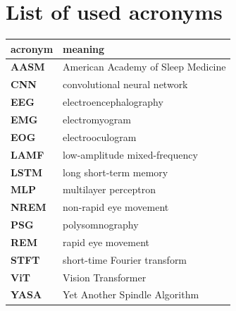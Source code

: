 \chapter*{List of used acronyms}
\begin{tabular}{l|l}
  {\bf acronym} & {\bf meaning}  \\ \hline
  {\bf AASM} & American Academy of Sleep Medicine \\
  {\bf CNN} & convolutional neural network \\
  {\bf EEG} & electroencephalography \\
  {\bf EMG} & electromyogram \\
  {\bf EOG} & electrooculogram \\
  {\bf LAMF} & low-amplitude mixed-frequency \\
  {\bf LSTM} & long short-term memory \\
  {\bf MLP} & multilayer perceptron \\
  {\bf NREM} & non-rapid eye movement \\
  {\bf PSG} & polysomnography \\
  {\bf REM} & rapid eye movement \\
  {\bf STFT} & short-time Fourier transform \\
  {\bf ViT} & Vision Transformer \\
  {\bf YASA} & Yet Another Spindle Algorithm \\
\end{tabular}
